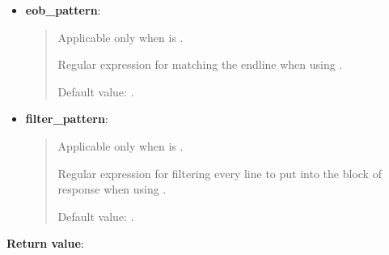 \begin{itemize}
\begin{quote}
    Default value: .
  \end{quote}

\item \textbf{eob\_pattern}:
  \begin{quote}
    Applicable only when  is .

    Regular expression for matching the endline when using .

    Default value: .
  \end{quote}

\item \textbf{filter\_pattern}:
  \begin{quote}
    Applicable only when  is .

    Regular expression for filtering every line to put into the block of response when using .

    Default value: .
  \end{quote}

\end{itemize}

\textbf{Return value}:

